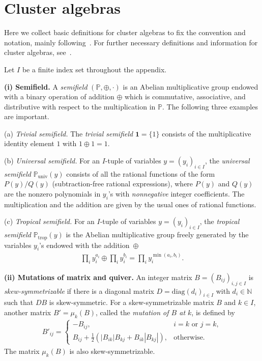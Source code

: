 \appendix
\section{Cluster algebras}

\label{sec:groc}

Here we collect basic def\/initions for cluster algebras
to f\/ix the convention and notation,
mainly following~\cite{Fomin07}.
For further necessary def\/initions and information
for cluster algebras, see~\cite{Fomin07}.

Let $I$ be a f\/inite index set throughout the appendix.

{\bf (i) Semif\/ield.}
A {\em semifield\/} $(\mathbb{P},\oplus, \cdot)$
is an Abelian multiplicative group
endowed with a binary
operation of addition $\oplus$ which is commutative,
associative, and distributive with respect to the
multiplication in $\mathbb{P}$.
The following three examples are important.


(a) {\em  Trivial semifield.}
The {\em trivial semifield\/}
$\mathbf{1}=\{\mathrm{1}\}$
consists of the multiplicative identity element $1$
with $1\oplus 1 = 1$.

\par
(b) {\em Universal semifield.}
For an $I$-tuple of variables $y=(y_i)_{i\in I}$,
the {\em universal semifield\/}
$\mathbb{P}_{\mathrm{univ}}(y)$
consists of  all the rational functions
of the form
$P(y)/Q(y)$  (subtraction-free  rational expressions),
where $P(y)$ and $Q(y)$ are the nonzero polynomials
 in $y_i$'s with {\em nonnegative\/} integer coef\/f\/icients.
The multiplication and the addition
are given by the usual ones of rational functions.


(c) {\em Tropical semifield.}
For an $I$-tuple of variables $y=(y_i)_{i\in I}$,
the {\em tropical semifield\/}
$\mathbb{P}_{\mathrm{trop}}(y)$
is the Abelian multiplicative group freely generated by
the variables  $y_i$'s endowed with the addition~$\oplus$
\begin{gather}
\label{eq:trop}
\prod_i y_i^{a_i}\oplus
\prod_i y_i^{b_i}
=
\prod_i y_i^{\min(a_i,b_i)}.
\end{gather}



{\bf (ii)  Mutations of matrix and quiver.}
An integer matrix
$B=(B_{ij})_{i,j\in I}$  is {\em skew-sym\-met\-ri\-zab\-le\/}
if there is a diagonal matrix $D=\mathrm{diag}
(d_i)_{i\in I}$ with $d_i\in \mathbb{N}$
such that $DB$ is skew-symmetric.
For a skew-symmetrizable matrix $B$ and
$k\in I$, another matrix $B'=\mu_k(B)$,
called the {\em mutation of $B$ at $k$\/}, is def\/ined by
\begin{gather}
\label{eq:Bmut}
B'_{ij}=
\begin{cases}
-B_{ij},& \mbox{$i=k$ or $j=k$},\\
B_{ij}+\frac{1}{2}
(|B_{ik}|B_{kj} + B_{ik}|B_{kj}|),
&\mbox{otherwise}.
\end{cases}
\end{gather}
The matrix $\mu_k(B)$ is also skew-symmetrizable.

